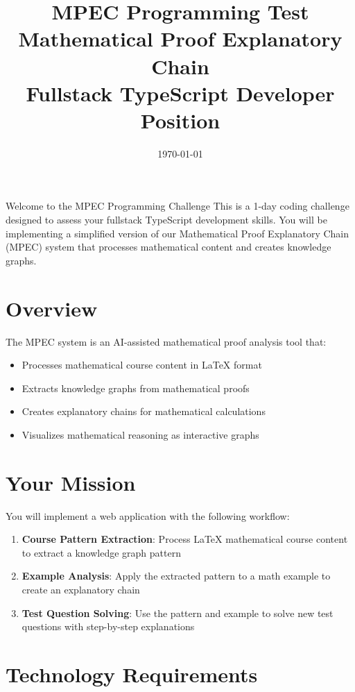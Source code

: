 \documentclass[11pt,a4paper]{article}
\title{
    \vspace{-1cm}
    \Huge\textbf{\textcolor{primaryblue}{MPEC Programming Test}} \\
    \Large\textcolor{secondaryblue}{Mathematical Proof Explanatory Chain} \\
    \large Fullstack TypeScript Developer Position
}
\author{}
\date{\today}
\begin{document}
\maketitle

\begin{infobox}{Welcome to the MPEC Programming Challenge}
This is a 1-day coding challenge designed to assess your fullstack TypeScript development skills. You will be implementing a simplified version of our Mathematical Proof Explanatory Chain (MPEC) system that processes mathematical content and creates knowledge graphs.
\end{infobox}

\section{Overview}

The MPEC system is an AI-assisted mathematical proof analysis tool that:
\begin{itemize}
    \item Processes mathematical course content in LaTeX format
    \item Extracts knowledge graphs from mathematical proofs
    \item Creates explanatory chains for mathematical calculations
    \item Visualizes mathematical reasoning as interactive graphs
\end{itemize}

\section{Your Mission}

You will implement a web application with the following workflow:

\begin{enumerate}
    \item \textbf{Course Pattern Extraction}: Process LaTeX mathematical course content to extract a knowledge graph pattern
    \item \textbf{Example Analysis}: Apply the extracted pattern to a math example to create an explanatory chain
    \item \textbf{Test Question Solving}: Use the pattern and example to solve new test questions with step-by-step explanations
\end{enumerate}

\section{Technology Requirements}
\end{document}
